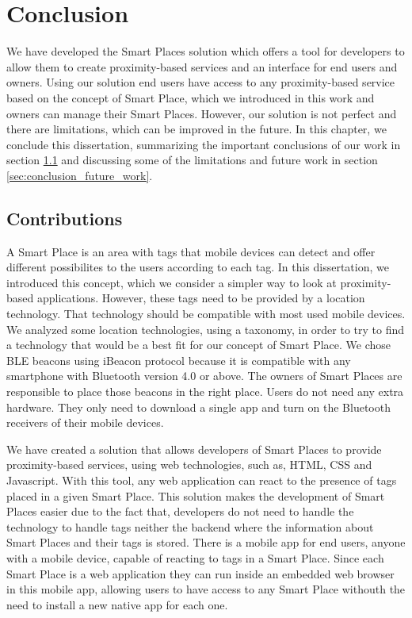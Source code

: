 
\chapter{Conclusion}
\label{chapter:conclusion}
We have developed the Smart Places solution which offers a tool for developers to allow them to create proximity-based services and an interface for end users and owners.
Using our solution end users have access to any proximity-based service based on the concept of Smart Place, which we introduced in this work and owners can manage their Smart Places.
However, our solution is not perfect and there are limitations, which can be improved in the future.
In this chapter, we conclude this dissertation, summarizing the important conclusions of our work in section \ref{sec:conclusion_contributions} and discussing some of the limitations and future work in section \ref{sec:conclusion_future_work}.

\section{Contributions}
\label{sec:conclusion_contributions}
A Smart Place is an area with tags that mobile devices can detect and offer different possibilites to the users according to each tag.
In this dissertation, we introduced this concept, which we consider a simpler way to look at proximity-based applications.
However, these tags need to be provided by a location technology.
That technology should be compatible with most used mobile devices.
We analyzed some location technologies, using a taxonomy\cite{location}, in order to try to find a technology that would be a best fit for our concept of Smart Place.
We chose \gls{BLE} beacons using iBeacon protocol because it is compatible with any smartphone with Bluetooth version 4.0 or above.
The owners of Smart Places are responsible to place those beacons in the right place.
Users do not need any extra hardware.
They only need to download a single app and turn on the Bluetooth receivers of their mobile devices.

We have created a solution that allows developers of Smart Places to provide proximity-based services, using web technologies, such as, \gls{HTML}, \gls{CSS} and Javascript.
With this tool, any web application can react to the presence of tags placed in a given Smart Place.
This solution makes the development of Smart Places easier due to the fact that, developers do not need to handle the technology to handle tags neither the backend where the information about Smart Places and their tags is stored.
There is a mobile app for end users, anyone with a mobile device, capable of reacting to tags in a Smart Place.
Since each Smart Place is a web application they can run inside an embedded web browser in this mobile app, allowing users to have access to any Smart Place withouth the need to install a new native app for each one.

